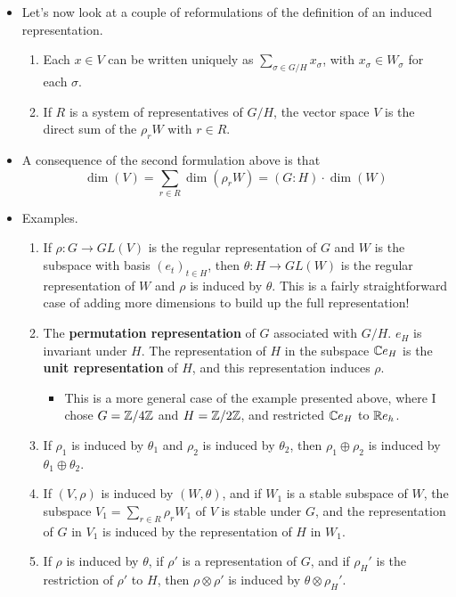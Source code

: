 \documentclass[../notes.tex]{subfiles}
\begin{document}
\begin{itemize}
    \item Let's now look at a couple of reformulations of the definition of an induced representation.
    \begin{enumerate}
        \item Each $x\in V$ can be written uniquely as $\sum_{\sigma\in G/H}x_\sigma$, with $x_\sigma\in W_\sigma$ for each $\sigma$.
        \item If $R$ is a system of representatives of $G/H$, the vector space $V$ is the direct sum of the $\rho_rW$ with $r\in R$.
    \end{enumerate}
    \item A consequence of the second formulation above is that
    \begin{equation*}
        \dim(V) = \sum_{r\in R}\dim(\rho_rW) = (G:H)\cdot\dim(W)
    \end{equation*}
    \item Examples.
    \begin{enumerate}
        \item If $\rho:G\to GL(V)$ is the regular representation of $G$ and $W$ is the subspace with basis $(e_t)_{t\in H}$, then $\theta:H\to GL(W)$ is the regular representation of $W$ and $\rho$ is induced by $\theta$. This is a fairly straightforward case of adding more dimensions to build up the full representation!
        \item The \textbf{permutation representation} of $G$ associated with $G/H$. $e_H$ is invariant under $H$. The representation of $H$ in the subspace $\mathbb{C} e_H$ is the \textbf{unit representation} of $H$, and this representation induces $\rho$.
        \begin{itemize}
            \item This is a more general case of the example presented above, where I chose $G=\mathbb{Z}/4\mathbb{Z}$ and $H=\mathbb{Z}/2\mathbb{Z}$, and restricted $\mathbb{C} e_H$ to $\mathbb{R} e_h$.
        \end{itemize}
        \item If $\rho_1$ is induced by $\theta_1$ and $\rho_2$ is induced by $\theta_2$, then $\rho_1\oplus\rho_2$ is induced by $\theta_1\oplus\theta_2$.
        \item If $(V,\rho)$ is induced by $(W,\theta)$, and if $W_1$ is a stable subspace of $W$, the subspace $V_1=\sum_{r\in R}\rho_rW_1$ of $V$ is stable under $G$, and the representation of $G$ in $V_1$ is induced by the representation of $H$ in $W_1$.
        \item If $\rho$ is induced by $\theta$, if $\rho'$ is a representation of $G$, and if $\rho_H'$ is the restriction of $\rho'$ to $H$, then $\rho\otimes\rho'$ is induced by $\theta\otimes\rho_H'$.

\end{enumerate}
\end{itemize}
\end{document}
